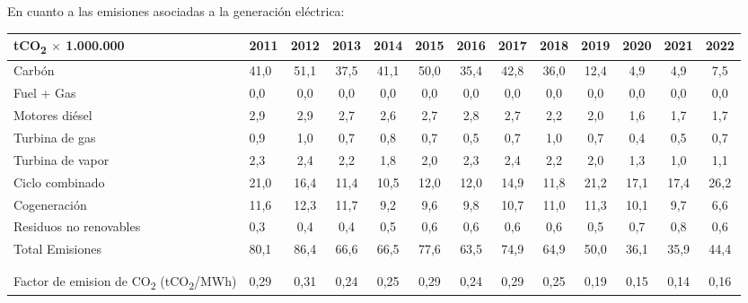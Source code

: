 \begin{figure}[H]
	\centering

\end{figure}

En cuanto a las emisiones asociadas a la generación eléctrica:
\begin{table}[H]
	\centering
	\begin{tabular}{p{3cm}l*{11}{c}}
		\toprule
		tCO\textsubscript{2} $\times$ 1.000.000& 2011 & 2012 & 2013 & 2014 & 2015 & 2016 & 2017 & 2018 & 2019 & 2020 & 2021 & 2022 \\
		\midrule
		Carbón &   41,0 & 51,1 & 37,5 & 41,1 & 50,0 & 35,4 & 42,8 & 36,0 & 12,4 & 4,9 & 4,9 & 7,5 \\
		Fuel + Gas  &  0,0 & 0,0 & 0,0 & 0,0 & 0,0 & 0,0 & 0,0 & 0,0 & 0,0 & 0,0 & 0,0 & 0,0 \\
		Motores diésel &  2,9 & 2,9 & 2,7 & 2,6 & 2,7 & 2,8 & 2,7 & 2,2 & 2,0 & 1,6 & 1,7 & 1,7 \\
		Turbina de gas &  0,9 & 1,0 & 0,7 & 0,8 & 0,7 & 0,5 & 0,7 & 1,0 & 0,7 & 0,4 & 0,5 & 0,7 \\
		Turbina de vapor &  2,3 & 2,4 & 2,2 & 1,8 & 2,0 & 2,3 & 2,4 & 2,2 & 2,0 & 1,3 & 1,0 & 1,1 \\
		Ciclo combinado  & 21,0 & 16,4 & 11,4 & 10,5 & 12,0 & 12,0 & 14,9 & 11,8 & 21,2 & 17,1 & 17,4 & 26,2 \\
		Cogeneración  &  11,6 & 12,3 & 11,7 & 9,2 & 9,6 & 9,8 & 10,7 & 11,0 & 11,3 & 10,1 & 9,7 & 6,6 \\
		Residuos no renovables &  0,3 & 0,4 & 0,4 & 0,5 & 0,6 & 0,6 & 0,6 & 0,6 & 0,5 & 0,7 & 0,8 & 0,6 \\
		Total Emisiones &  80,1 & 86,4 & 66,6 & 66,5 & 77,6 & 63,5 & 74,9 & 64,9 & 50,0 & 36,1 & 35,9 & 44,4 \\ 
		\\
		\hline
		\\
		Factor de emision de CO\textsubscript{2} (tCO\textsubscript{2}/MWh) &  0,29 & 0,31 & 0,24 & 0,25 & 0,29 & 0,24 & 0,29 & 0,25 & 0,19 & 0,15 & 0,14 & 0,16 \\
		\bottomrule
	\end{tabular}
\end{table}

